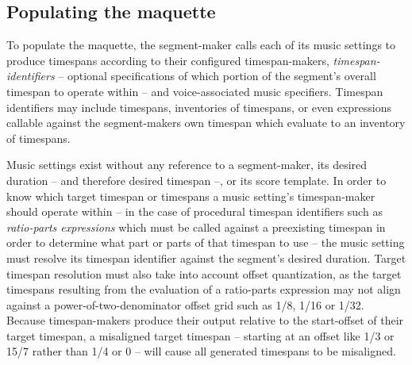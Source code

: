 \subsection{Populating the maquette}
\label{ssec:populating-the-maquette}

To populate the maquette, the segment-maker calls each of its music settings to
produce timespans according to their configured timespan-makers,
\emph{timespan-identifiers} -- optional specifications of which portion of the
segment's overall timespan to operate within -- and voice-associated music
specifiers. Timespan identifiers may include timespans, inventories of
timespans, or even expressions callable against the segment-makers own timespan
which evaluate to an inventory of timespans.

Music settings exist without any reference to a segment-maker, its desired
duration -- and therefore desired timespan --, or its score template. In order
to know which target timespan or timespans a music setting's timespan-maker
should operate within -- in the case of procedural timespan identifiers such as
\emph{ratio-parts expressions} which must be called against a preexisting
timespan in order to determine what part or parts of that timespan to use --
the music setting must resolve its timespan identifier against the segment's
desired duration. Target timespan resolution must also take into account offset
quantization, as the target timespans resulting from the evaluation of a
ratio-parts expression may not align against a power-of-two-denominator offset
grid such as 1/8, 1/16 or 1/32. Because timespan-makers produce their output
relative to the start-offset of their target timespan, a misaligned target
timespan -- starting at an offset like 1/3 or 15/7 rather than 1/4 or 0 -- will
cause all generated timespans to be misaligned.


